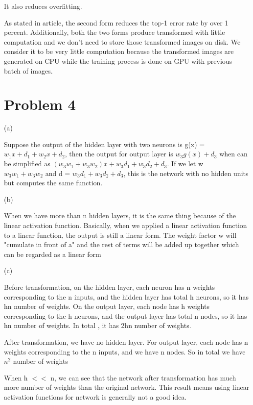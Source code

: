 \documentclass[11pt]{article}
\begin{document}
It also reduces overfitting. \newline

As stated in article, the second form reduces the top-1 error rate by over 1 percent. Additionally, both the two forms produce transformed with little computation and we don't need to store those transformed images on disk. We consider it to be very little computation because the transformed images are generated on CPU while the training process is done on GPU with previous batch of images. \newline

\clearpage

\section*{Problem 4}

(a) \newline

Suppose the output of the hidden layer with two neurons is g(x) = $w_{1}x + d_{1} + w_{2}x + d_{2}$, then the output for output layer is $w_{3}g(x) + d_{3}$ when can be simplified as $(w_{3}w_{1}+w_{3}w_{2})x+w_{3}d_{1}+w_{3}d_{2}+d_{3}$. If we let w = $w_{3}w_{1}+w_{3}w_{2}$ and d = $w_{3}d_{1}+w_{3}d_{2}+d_{3}$, this is the network with no hidden units but computes the same function. \newline

\noindent (b) \newline

When we have more than n hidden layers, it is the same thing because of the linear activation function. Basically, when we applied a linear activation function to a linear function, the output is still a linear form. The weight factor w will "cumulate in front of a" and the rest of terms will be added up together which can be regarded as a linear form \newline

\noindent (c) \newline

Before transformation, on the hidden layer, each neuron has n weights corresponding to the n inputs, and the hidden layer has total h neurons, so it has hn number of weights. On the output layer, each node has h weights corresponding to the h neurons, and the output layer has total n nodes, so it has hn number of weights. In total , it has 2hn number of weights. \newline

After transformation, we have no hidden layer. For output layer, each node has n weights corresponding to the n inputs, and we have n nodes. So in total we have $n^2$ number of weights \newline

When h $<<$ n, we can see that the network after transformation has much more number of weights than the original network. This result means using linear activation functions for network is generally not a good idea. \newline




 
\end{document}
